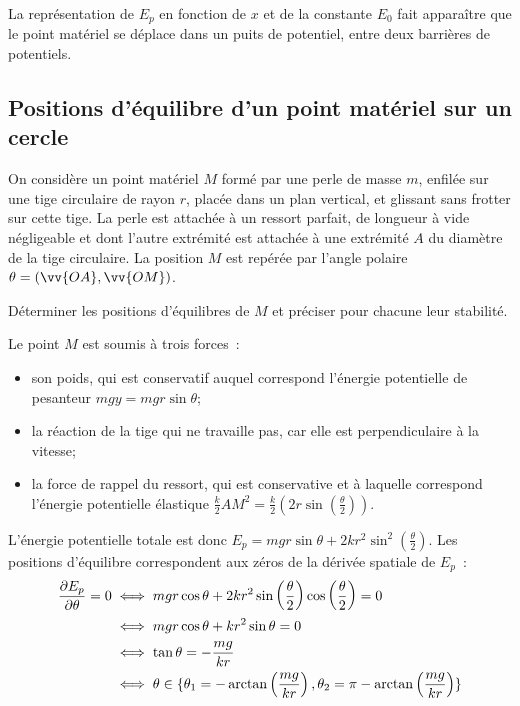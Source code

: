 La représentation de \(E_p\) en fonction de \(x\) et de la constante \(E_0\) fait apparaître que le point matériel se déplace dans un puits de potentiel, entre deux barrières de potentiels.

\subsection{Positions d'équilibre d'un point matériel sur un cercle}
\label{chap4-subsec:positionsdequilibredunpointsuruncercle}

On considère un point matériel \(M\) formé par une perle de masse \(m\), enfilée sur une tige circulaire de rayon \(r\), placée dans un plan vertical, et glissant sans frotter sur cette tige. La perle est attachée à un ressort parfait, de longueur à vide négligeable et dont l'autre extrémité est attachée à une extrémité \(A\) du diamètre de la tige circulaire. La position \(M\) est repérée par l'angle polaire \(\theta = (\vv{OA}, \vv{OM})\). 

Déterminer les positions d'équilibres de \(M\) et préciser pour chacune leur stabilité.

Le point \(M\) est soumis à trois forces~:
\begin{itemize}
\item son poids, qui est conservatif auquel correspond l'énergie potentielle de pesanteur \(mgy=mgr\sin\theta\);
\item la réaction de la tige qui ne travaille pas, car elle est perpendiculaire à la vitesse;
\item la force de rappel du ressort, qui est conservative et à laquelle correspond l'énergie potentielle élastique \(\frac{k}{2}AM^2=\frac{k}{2}\left(2r\sin\left(\frac{\theta}{2}\right)\right)\).
\end{itemize}

L'énergie potentielle totale est donc \(E_p = mgr \sin\theta + 2kr^2 \sin^2\left(\frac{\theta}{2}\right)\). Les positions d'équilibre correspondent aux zéros de la dérivée spatiale de \(E_p\)~:
\begin{align}
  \dfrac{\partial E_p}{\partial \theta} = 0 &\iff mgr\cos\theta +2kr^2 \sin\left(\frac{\theta}{2}\right) \cos\left(\frac{\theta}{2}\right)=0 \\
  & \iff mgr\cos\theta + kr^2 \sin\theta=0 \\
  & \iff \tan\theta = -\frac{mg}{kr} \\
  & \iff \theta \in \{\theta_1=-\arctan \left( \frac{mg}{kr} \right), \theta_2=\pi-\arctan \left( \frac{mg}{kr} \right)\}
\end{align}

